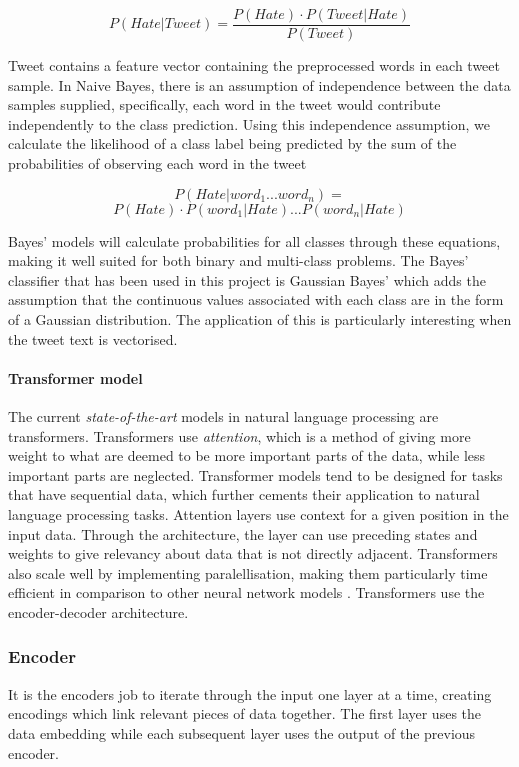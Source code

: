 \documentclass[conference]{IEEEtran}
\begin{document}
\[P(Hate|Tweet) = \frac{P(Hate) \cdot P(Tweet|Hate)}{P(Tweet)}\]

Tweet contains a feature vector containing the preprocessed words in each tweet sample. In Naive Bayes, there is an assumption of independence between the data samples supplied, specifically, each word in the tweet would contribute independently to the class prediction. Using this independence assumption, we calculate the likelihood of a class label being predicted by the sum of the probabilities of observing each word in the tweet

\[P(Hate|word_1 ... word_n) = \] 
\[P(Hate) \cdot P(word_1|Hate)... P(word_n|Hate)\]

Bayes' models will calculate probabilities for all classes through these equations, making it well suited for both binary and multi-class problems.
The Bayes' classifier that has been used in this project is Gaussian Bayes' which adds the assumption that the continuous values associated with each class are in the form of a Gaussian distribution. The application of this is particularly interesting when the tweet text is vectorised.\\

\paragraph{\textbf{Transformer model}}
The current \textit{state-of-the-art} models in natural language processing are transformers. Transformers use \textit{attention}, which is a method of giving more weight to what are deemed to be more important parts of the data, while less important parts are neglected. Transformer models tend to be designed for tasks that have sequential data, which further cements their application to natural language processing tasks. Attention layers use context for a given position in the input data. Through the architecture, the layer can use preceding states and weights to give relevancy about data that is not directly adjacent. Transformers also scale well by implementing paralellisation, making them particularly time efficient in comparison to other neural network models \cite{15}.
Transformers use the encoder-decoder architecture.

\subsubsection{\textbf{Encoder}} It is the encoders job to iterate through the input one layer at a time, creating encodings which link relevant pieces of data together. The first layer uses the data embedding while each subsequent layer uses the output of the previous encoder.
\end{document}
